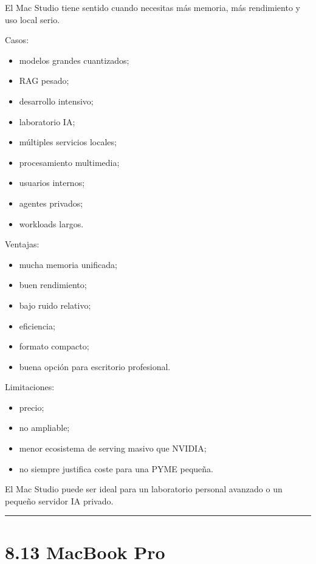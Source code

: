 El Mac Studio tiene sentido cuando necesitas más memoria, más
rendimiento y uso local serio.

Casos:

\begin{itemize}
\tightlist
\item
  modelos grandes cuantizados;
\item
  RAG pesado;
\item
  desarrollo intensivo;
\item
  laboratorio IA;
\item
  múltiples servicios locales;
\item
  procesamiento multimedia;
\item
  usuarios internos;
\item
  agentes privados;
\item
  workloads largos.
\end{itemize}

Ventajas:

\begin{itemize}
\tightlist
\item
  mucha memoria unificada;
\item
  buen rendimiento;
\item
  bajo ruido relativo;
\item
  eficiencia;
\item
  formato compacto;
\item
  buena opción para escritorio profesional.
\end{itemize}

Limitaciones:

\begin{itemize}
\tightlist
\item
  precio;
\item
  no ampliable;
\item
  menor ecosistema de serving masivo que NVIDIA;
\item
  no siempre justifica coste para una PYME pequeña.
\end{itemize}

El Mac Studio puede ser ideal para un laboratorio personal avanzado o un
pequeño servidor IA privado.

\begin{center}\rule{0.5\linewidth}{0.5pt}\end{center}

\section{8.13 MacBook Pro}\label{macbook-pro}

